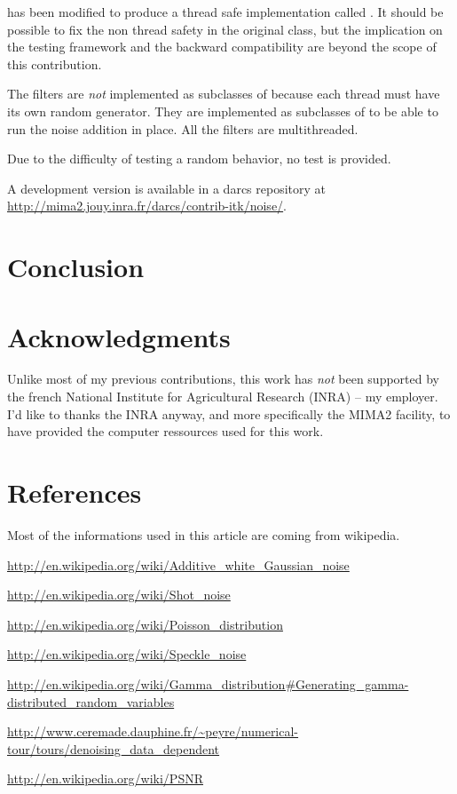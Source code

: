 \documentclass{InsightArticle}
\begin{document}
 has been modified to produce a thread safe
implementation called . It should be
possible to fix the non thread safety in the original class, but the implication on the testing
framework and the backward compatibility are beyond the scope of this contribution.

The filters are {\em not} implemented as subclasses of 
because each thread must have its own random generator. They are implemented as subclasses
of  to be able to run the noise addition in place. All the
filters are multithreaded.

Due to the difficulty of testing a random behavior, no test is provided.

A development version is available in a darcs repository at
\url{http://mima2.jouy.inra.fr/darcs/contrib-itk/noise/}.

\section{Conclusion}

\section{Acknowledgments}

Unlike most of my previous contributions, this work has {\em not} been supported by
the french National Institute for Agricultural Research (INRA) -- my employer.
I'd like to thanks the INRA anyway, and more specifically the MIMA2 facility, to
have provided the computer ressources used for this work. 

\section{References}

Most of the informations used in this article are coming from wikipedia.

\url{http://en.wikipedia.org/wiki/Additive_white_Gaussian_noise}

\url{http://en.wikipedia.org/wiki/Shot_noise}

\url{http://en.wikipedia.org/wiki/Poisson_distribution}

\url{http://en.wikipedia.org/wiki/Speckle_noise}

\url{http://en.wikipedia.org/wiki/Gamma_distribution#Generating_gamma-distributed_random_variables}

\url{http://www.ceremade.dauphine.fr/~peyre/numerical-tour/tours/denoising_data_dependent}

\url{http://en.wikipedia.org/wiki/PSNR}
\end{document}
